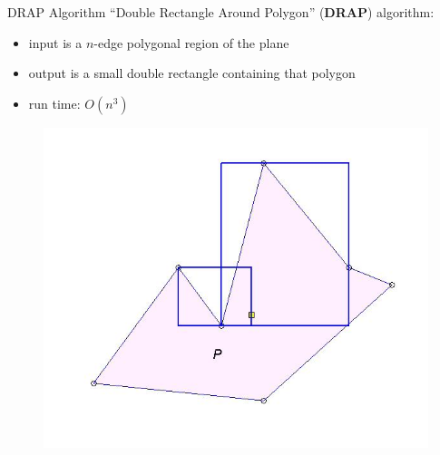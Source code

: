 \begin{frame}{DRAP Algorithm}
  ``Double Rectangle Around Polygon'' (\textbf{DRAP}) algorithm:\\
  \begin{itemize}
  \item input is a $n$-edge polygonal region of the plane
  \item output is a small double rectangle containing that polygon
  \item run time: $O(n^3)$
  \end{itemize}
  \begin{figure}
    \includegraphics[scale=0.3]{figs/drap3.jpg}
  \end{figure}
\end{frame}

